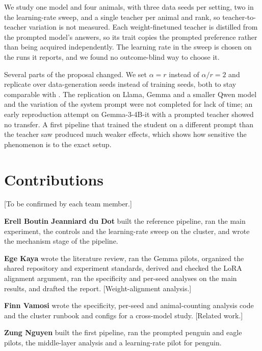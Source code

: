 \documentclass[11pt]{article}
\newcommand{\todo}[1]{\textcolor{red!70!black}{[#1]}}
\begin{document}
We study one model and four animals, with three data seeds per setting, two in the learning-rate sweep, and a single teacher per animal and rank, so teacher-to-teacher variation is not measured. Each weight-finetuned teacher is distilled from the prompted model's answers, so its trait copies the prompted preference rather than being acquired independently. The learning rate in the sweep is chosen on the runs it reports, and we found no outcome-blind way to choose it.

Several parts of the proposal changed. We set $\alpha = r$ instead of $\alpha/r = 2$ and replicate over data-generation seeds instead of training seeds, both to stay comparable with \citet{nief2026lora}. The replication on Llama, Gemma and a smaller Qwen model and the variation of the system prompt were not completed for lack of time; an early reproduction attempt on Gemma-3-4B-it with a prompted teacher showed no transfer. A first pipeline that trained the student on a different prompt than the teacher saw produced much weaker effects, which shows how sensitive the phenomenon is to the exact setup.

\section*{Contributions}

\todo{To be confirmed by each team member.}

\textbf{Erell Boutin Jeanniard du Dot} built the reference pipeline, ran the main experiment, the controls and the learning-rate sweep on the cluster, and wrote the mechanism stage of the pipeline.

\textbf{Ege Kaya} wrote the literature review, ran the Gemma pilots, organized the shared repository and experiment standards, derived and checked the LoRA alignment argument, ran the specificity and per-seed analyses on the main results, and drafted the report. \todo{Weight-alignment analysis.}

\textbf{Finn Vamosi} wrote the specificity, per-seed and animal-counting analysis code and the cluster runbook and configs for a cross-model study. \todo{Related work.}

\textbf{Zung Nguyen} built the first pipeline, ran the prompted penguin and eagle pilots, the middle-layer analysis and a learning-rate pilot for penguin.


\end{document}

